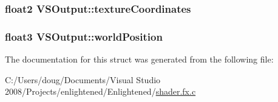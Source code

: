 \hypertarget{struct_v_s_output_a7fcd6443a5043bbfd98d1ff3b415b84b}{
\subsubsection[{textureCoordinates}]{\setlength{\rightskip}{0pt plus 5cm}float2 {\bf VSOutput::textureCoordinates}}}
\label{struct_v_s_output_a7fcd6443a5043bbfd98d1ff3b415b84b}
\hypertarget{struct_v_s_output_a8151fbd902476f1b8fd2034c78f31ec5}{
\subsubsection[{worldPosition}]{\setlength{\rightskip}{0pt plus 5cm}float3 {\bf VSOutput::worldPosition}}}
\label{struct_v_s_output_a8151fbd902476f1b8fd2034c78f31ec5}


The documentation for this struct was generated from the following file:\begin{DoxyCompactItemize}
\item 
C:/Users/doug/Documents/Visual Studio 2008/Projects/enlightened/Enlightened/\hyperlink{shader_8fx_8c}{shader.fx.c}\end{DoxyCompactItemize}
